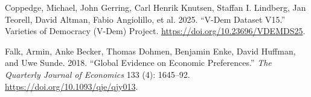 \documentclass[
  letterpaper,
  DIV=11,
  numbers=noendperiod]{scrartcl}
\newlength{\cslhangindent}
\newlength{\cslentryspacingunit} %
\newenvironment{CSLReferences}[2] %
 {%
  \setlength{\parindent}{0pt}
  \ifodd #1
  \let\oldpar\par
  \def\par{\hangindent=\cslhangindent\oldpar}
  \fi
  \setlength{\parskip}{#2\cslentryspacingunit}
 }%
 {}
\begin{document}
\hypertarget{refs}{}
\begin{CSLReferences}{1}{0}
\leavevmode{}%
Coppedge, Michael, John Gerring, Carl Henrik Knutsen, Staffan I.
Lindberg, Jan Teorell, David Altman, Fabio Angiolillo, et al. 2025.
{``V-Dem Dataset V15.''} Varieties of Democracy (V-Dem) Project.
\url{https://doi.org/10.23696/VDEMDS25}.

\leavevmode{}%
Falk, Armin, Anke Becker, Thomas Dohmen, Benjamin Enke, David Huffman,
and Uwe Sunde. 2018. {``Global Evidence on Economic Preferences.''}
\emph{The Quarterly Journal of Economics} 133 (4): 1645--92.
\url{https://doi.org/10.1093/qje/qjy013}.

\end{CSLReferences}
\end{document}
